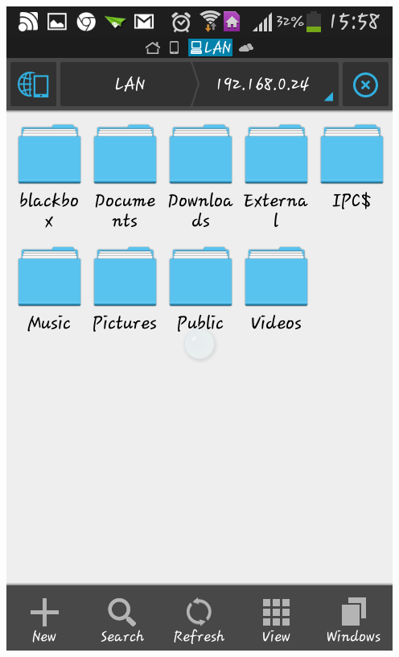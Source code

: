 \documentclass[letterpaper,10pt,english]{sphinxmanual}
\begin{document}
\includegraphics{es2.png}
\end{document}
